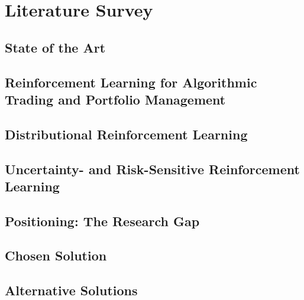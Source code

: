 \chapter{Literature Survey}


\section{State of the Art}

\section{Reinforcement Learning for Algorithmic Trading and Portfolio Management}

\section{Distributional Reinforcement Learning}

\section{Uncertainty- and Risk-Sensitive Reinforcement Learning}

\section{Positioning: The Research Gap}

\section{Chosen Solution}

\section{Alternative Solutions}
